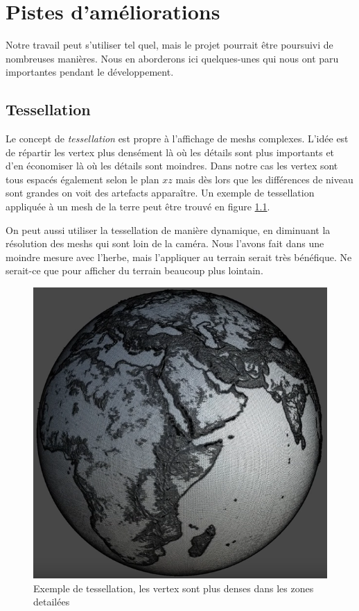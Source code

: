 \documentclass{EPUProjetDi}
\begin{document}
\chapter{Pistes d'améliorations}

Notre travail peut s'utiliser tel quel, mais le projet pourrait être poursuivi de nombreuses manières. Nous en aborderons ici quelques-unes qui nous ont paru importantes pendant le développement.

\section{Tessellation}

Le concept de \textit{tessellation} est propre à l'affichage de meshs complexes. L'idée est de répartir les vertex plus densément là où les détails sont plus importants et d'en économiser là où les détails sont moindres. Dans notre cas les vertex sont tous espacés également selon le plan $xz$ mais dès lors que les différences de niveau sont grandes on voit des artefacts apparaître. Un exemple de tessellation appliquée à un mesh de la terre peut être trouvé en figure \ref{fig:tessellation_example}.
\par
On peut aussi utiliser la tessellation de manière dynamique, en diminuant la résolution des meshs qui sont loin de la caméra. Nous l'avons fait dans une moindre mesure avec l'herbe, mais l'appliquer au terrain serait très bénéfique. Ne serait-ce que pour afficher du terrain beaucoup plus lointain.

\begin{figure}[ht]
	\centering
	\includegraphics[scale=.4]{tessellation}
	\caption{Exemple de tessellation, les vertex sont plus denses dans les zones detailées\cite{tessellation}}
	\label{fig:tessellation_example}
\end{figure}
\end{document}
